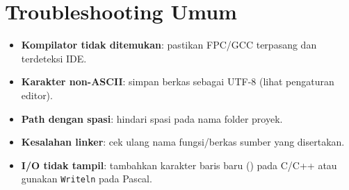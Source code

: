 \documentclass[../main.tex]{subfiles}
\begin{document}
\section{Troubleshooting Umum}
\begin{itemize}
  \item \textbf{Kompilator tidak ditemukan}: pastikan FPC/GCC terpasang dan terdeteksi IDE.
  \item \textbf{Karakter non-ASCII}: simpan berkas sebagai UTF-8 (lihat pengaturan editor).
  \item \textbf{Path dengan spasi}: hindari spasi pada nama folder proyek.
  \item \textbf{Kesalahan linker}: cek ulang nama fungsi/berkas sumber yang disertakan.
  \item \textbf{I/O tidak tampil}: tambahkan karakter baris baru (\texttt{\n}) pada C/C++ atau gunakan \texttt{Writeln} pada Pascal.
\end{itemize}
\end{document}
